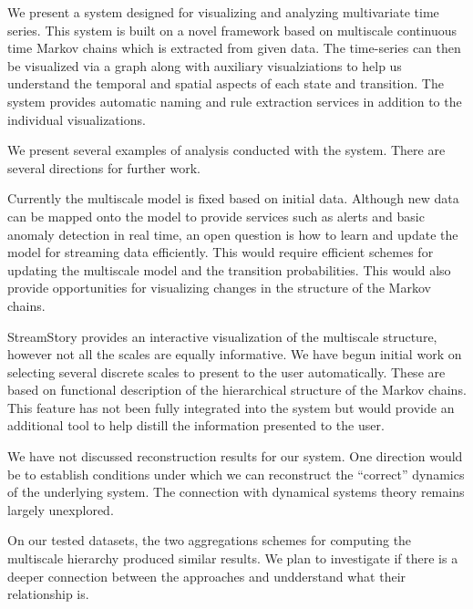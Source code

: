We present a system designed for visualizing and analyzing multivariate time series. This system is built on a novel framework based on multiscale continuous time Markov chains which is extracted from given data. The time-series can then be visualized via a graph along with auxiliary visualziations to help us understand the temporal and spatial aspects of each state and transition. The system provides automatic naming and rule extraction services in addition to the individual visualizations.  

We present several examples of analysis conducted with the system.  There are several directions for further work. 

 Currently the multiscale model is fixed based on initial data. Although new data can be mapped onto the model to provide services such as alerts and basic anomaly detection in real time, an open question is how to learn and update the model for streaming data efficiently. This would require efficient schemes for updating the multiscale model and the transition probabilities. This would also provide opportunities for visualizing changes in the structure of the Markov chains.

 StreamStory provides an interactive visualization of the multiscale structure, however not all the scales are equally informative.  We have begun initial work on selecting several discrete scales to present to the user automatically. These are based on functional description of the hierarchical structure of the Markov chains. This feature has not been fully integrated into the system but would provide an additional tool to help distill the  information presented to the user. 

 We have not discussed reconstruction results for our system. One direction would be to establish conditions under which we can reconstruct the ``correct'' dynamics of the underlying system. The connection with dynamical systems theory remains largely unexplored.

 On our tested datasets, the two aggregations schemes for computing the multiscale hierarchy produced similar results. We plan to investigate if there is a deeper connection between the approaches and undderstand what their relationship is. 






